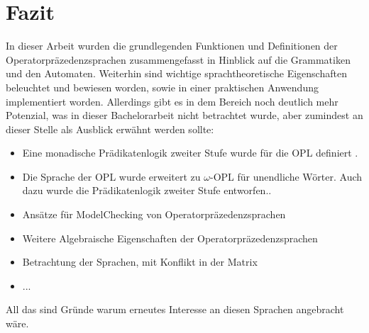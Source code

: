 \section{Fazit}
In dieser Arbeit wurden die grundlegenden Funktionen und Definitionen der Operatorpräzedenzsprachen zusammengefasst in Hinblick auf die Grammatiken und den Automaten. Weiterhin sind wichtige sprachtheoretische Eigenschaften beleuchtet und bewiesen worden, sowie in einer praktischen Anwendung implementiert worden. Allerdings gibt es in dem Bereich noch deutlich mehr Potenzial, was in dieser Bachelorarbeit nicht betrachtet wurde, aber zumindest an dieser Stelle als Ausblick erwähnt werden sollte: \begin{itemize}
\item
Eine monadische Prädikatenlogik zweiter Stufe  wurde für die OPL definiert \cite{mso}. 
\item
Die Sprache der OPL wurde erweitert zu $\omega$-OPL für unendliche Wörter. Auch dazu wurde die Prädikatenlogik zweiter Stufe entworfen.\cite{mso}.
\item
Ansätze für ModelChecking von Operatorpräzedenzsprachen \cite{modelchecking}
\item
Weitere Algebraische Eigenschaften der Operatorpräzedenzsprachen \cite{algebraic_properties}
\item
Betrachtung der Sprachen, mit Konflikt in der Matrix
\item
...
\end{itemize}
All das sind Gründe warum erneutes Interesse an diesen Sprachen angebracht wäre. 